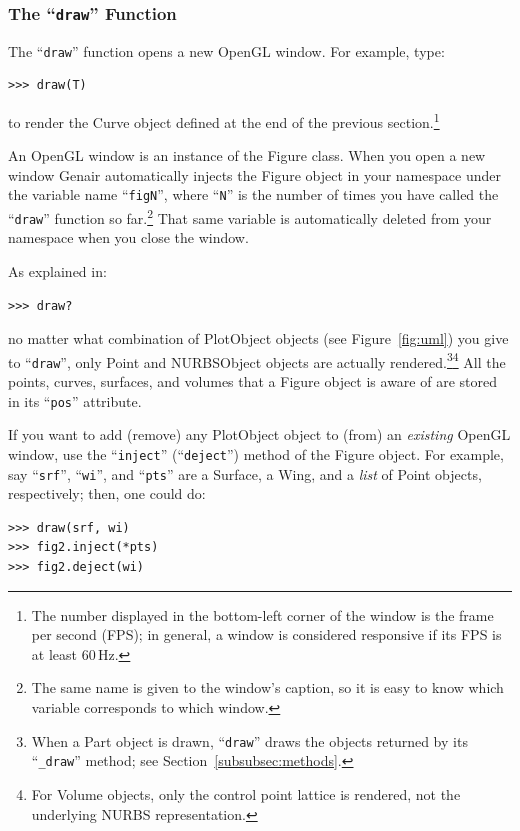 \documentclass[]{article}
\begin{document}
\subsubsection{The ``\texttt{draw}'' Function}
\label{subsubsec:draw}

The ``\texttt{draw}'' function opens a new OpenGL window.  For example, 
type:
\begin{verbatim}
>>> draw(T)
\end{verbatim}
to render the Curve object defined at the end of the previous 
section.\footnote{The number displayed in the bottom-left corner of the 
window is the frame per second (FPS); in general, a window is considered 
responsive if its FPS is at least $60\,\text{Hz}$.}

An OpenGL window is an instance of the Figure class.  When you open a 
new window Genair automatically injects the Figure object in your 
namespace under the variable name ``\texttt{figN}'', where 
``\texttt{N}'' is the number of times you have called the 
``\texttt{draw}'' function so far.\footnote{The same name is given to 
the window's caption, so it is easy to know which variable corresponds 
to which window.}  That same variable is automatically deleted from your 
namespace when you close the window.

As explained in:
\begin{verbatim}
>>> draw?
\end{verbatim}
no matter what combination of PlotObject objects (see 
Figure~\ref{fig:uml}) you give to ``\texttt{draw}'', only Point and 
NURBSObject objects are actually rendered.\footnote{When a Part object 
is drawn, ``\texttt{draw}'' draws the objects returned by its 
``\texttt{\_draw}'' method; see 
Section~\ref{subsubsec:methods}.}\footnote{For Volume objects, only the 
control point lattice is rendered, not the underlying NURBS 
representation.}  All the points, curves, surfaces, and volumes that a 
Figure object is aware of are stored in its ``\texttt{pos}'' attribute.

If you want to add (remove) any PlotObject object to (from) an 
\emph{existing} OpenGL window, use the ``\texttt{inject}'' 
(``\texttt{deject}'') method of the Figure object.  For example, say 
``\texttt{srf}'', ``\texttt{wi}'', and ``\texttt{pts}'' are a Surface, a 
Wing, and a \emph{list} of Point objects, respectively; then, one could 
do:
\begin{verbatim}
>>> draw(srf, wi)
>>> fig2.inject(*pts)
>>> fig2.deject(wi)
\end{verbatim}
\end{document}
